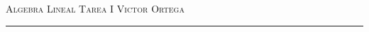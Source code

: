 \documentclass[12pt]{article}
\begin{document}
\thispagestyle{empty}

{\scshape Algebra Lineal} \hfill {\scshape \large Tarea I} \hfill {\scshape Victor Ortega}
 
\smallskip

\hrule

\bigskip

\bigskip

\theoremstyle{definition}
\newtheorem*{definition}{Definición}

\theoremstyle{definition}
\newtheorem*{dem}{Demostración}

\theoremstyle{definition}
\newtheorem*{notation}{Notación}

\theoremstyle{definition}
\newtheorem*{theorem}{Teorema}

\theoremstyle{definition}
\newtheorem*{lema}{Lema}

\theoremstyle{remark}
\newtheorem*{observation}{Observación}

\theoremstyle{remark}
\newtheorem*{example}{Ejemplo}
\end{document}
